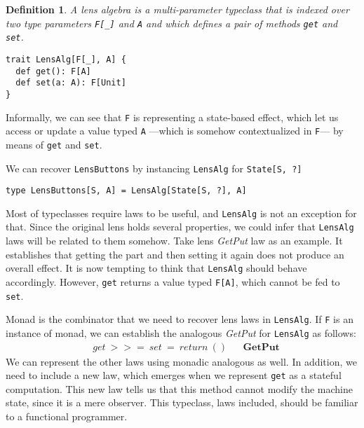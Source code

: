 \documentclass[preview, 3p]{elsarticle}
\newtheorem{definition}{Definition}[section]
\begin{document}
\begin{definition}
A lens algebra is a multi-parameter typeclass that is indexed over two type
parameters \lstinline{F[_]} and \lstinline{A} and which defines a pair of
methods \lstinline{get} and \lstinline{set}.
\begin{lstlisting}
trait LensAlg[F[_], A] {
  def get(): F[A]
  def set(a: A): F[Unit]
}
\end{lstlisting}
\end{definition}

Informally, we can see that \lstinline{F} is representing a state-based effect,
which let us access or update a value typed \lstinline{A} ---which is somehow
contextualized in \lstinline{F}--- by means of \lstinline{get} and
\lstinline{set}.

\begin{remark}

We can recover \lstinline{LensButtons} by instancing \lstinline{LensAlg} for
\lstinline{State[S, ?]}

\begin{lstlisting}
type LensButtons[S, A] = LensAlg[State[S, ?], A]
\end{lstlisting}

\end{remark}

Most of typeclasses require laws to be useful, and \lstinline{LensAlg} is not an
exception for that. Since the original lens holds several properties, we could
infer that \lstinline{LensAlg} laws will be related to them somehow. Take lens
\emph{GetPut} law as an example. It establishes that getting the part and then
setting it again does not produce an overall effect. It is now tempting to think
that \lstinline{LensAlg} should behave accordingly. However, \lstinline{get}
returns a value typed \lstinline{F[A]}, which cannot be fed to \lstinline{set}.

Monad is the combinator that we need to recover lens laws in
\lstinline{LensAlg}. If \lstinline{F} is an instance of monad, we can establish
the analogous \emph{GetPut} for \lstinline{LensAlg} as follows:
\begin{align*}
  & get\ >>=\ set\ =\ return\ () &&\textbf{GetPut}
\end{align*}
We can represent the other laws using monadic analogous as well. In addition, we
need to include a new law, which emerges when we represent \lstinline{get} as a
stateful computation. This new law tells us that this method cannot modify the
machine state, since it is a mere observer. This typeclass, laws included,
should be familiar to a functional programmer.
\end{document}
